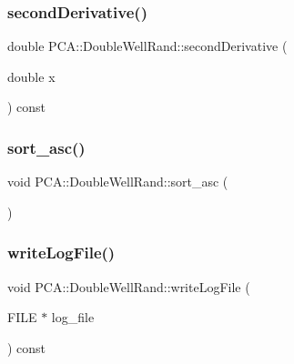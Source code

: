 \hypertarget{class_p_c_a_1_1_double_well_rand_a20c4fa6e77dad5161a214706adeda281}{}\label{class_p_c_a_1_1_double_well_rand_a20c4fa6e77dad5161a214706adeda281} 
\subsubsection{\texorpdfstring{second\+Derivative()}{secondDerivative()}}
{\footnotesize\ttfamily double P\+C\+A\+::\+Double\+Well\+Rand\+::second\+Derivative (\begin{DoxyParamCaption}\item[{double}]{x }\end{DoxyParamCaption}) const\hspace{0.3cm}{\ttfamily [private]}}

\hypertarget{class_p_c_a_1_1_double_well_rand_a60ad7eeeb8f90a0e7312689820591674}{}\label{class_p_c_a_1_1_double_well_rand_a60ad7eeeb8f90a0e7312689820591674} 
\subsubsection{\texorpdfstring{sort\+\_\+asc()}{sort\_asc()}}
{\footnotesize\ttfamily void P\+C\+A\+::\+Double\+Well\+Rand\+::sort\+\_\+asc (\begin{DoxyParamCaption}{ }\end{DoxyParamCaption})\hspace{0.3cm}{\ttfamily [private]}}

\hypertarget{class_p_c_a_1_1_double_well_rand_aead9619d86b833eb5d9753a94294bc93}{}\label{class_p_c_a_1_1_double_well_rand_aead9619d86b833eb5d9753a94294bc93} 
\subsubsection{\texorpdfstring{write\+Log\+File()}{writeLogFile()}}
{\footnotesize\ttfamily void P\+C\+A\+::\+Double\+Well\+Rand\+::write\+Log\+File (\begin{DoxyParamCaption}\item[{F\+I\+LE $\ast$}]{log\+\_\+file }\end{DoxyParamCaption}) const}



